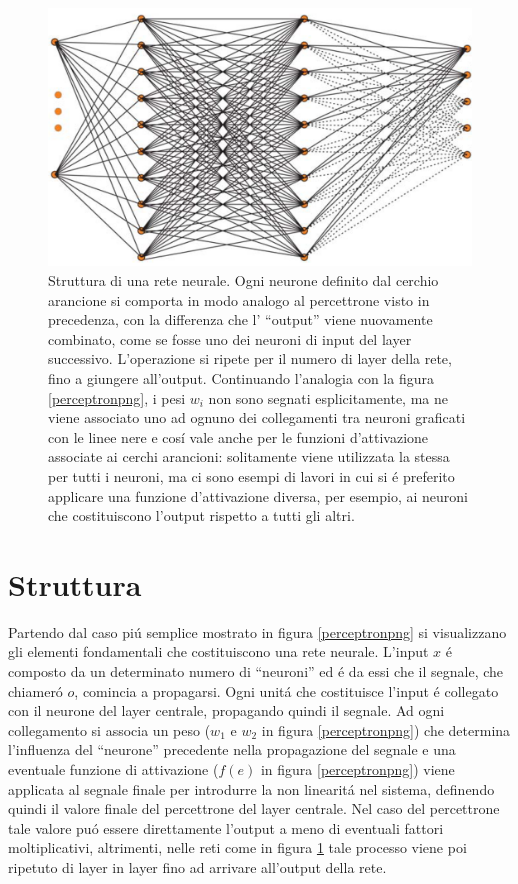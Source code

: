 \documentclass[a4paper,12pt]{report}
\begin{document}
 \begin{figure}[h!]
  \centering
  \includegraphics[scale=0.35]{NeuralNetwork.png}
  \caption{Struttura di una rete neurale. Ogni neurone definito dal cerchio arancione si comporta in modo analogo al percettrone visto in precedenza, con la differenza che l' ``output'' viene nuovamente combinato, come se fosse uno dei neuroni di input del layer successivo. L'operazione si ripete per il numero di layer della rete, fino a giungere all'output. Continuando l'analogia con la figura \ref{perceptronpng}, i pesi $w_i$ non sono segnati esplicitamente, ma ne viene associato uno ad ognuno dei collegamenti tra neuroni graficati con le linee nere e cos\'i vale anche per le funzioni d'attivazione associate ai cerchi arancioni: solitamente viene utilizzata la stessa per tutti i neuroni, ma ci sono esempi di lavori in cui si \'e preferito applicare una funzione d'attivazione diversa, per esempio, ai neuroni che costituiscono l'output rispetto a tutti gli altri.}
  \label{NeuralNetworkpng}
 \end{figure}

 \section{Struttura} 
 Partendo dal caso pi\'u semplice mostrato in figura \ref{perceptronpng} si visualizzano gli elementi fondamentali che costituiscono una rete neurale. 
 L'input $x$ \'e composto da un determinato numero di ``neuroni'' ed \'e da essi che il segnale, che chiamer\'o $o$, comincia a propagarsi. 
 Ogni unit\'a che costituisce l'input \'e collegato con il neurone del layer centrale, propagando quindi il segnale. 
 Ad ogni collegamento si associa un peso ($w_1$ e $w_2$ in figura \ref{perceptronpng}) che determina l'influenza del ``neurone'' precedente nella propagazione del segnale e una eventuale funzione di attivazione ($f(e)$ in figura \ref{perceptronpng}) viene applicata al segnale finale per introdurre la non linearit\'a nel sistema, definendo quindi il valore finale del percettrone del layer centrale. 
 Nel caso del percettrone tale valore pu\'o essere direttamente l'output a meno di eventuali fattori moltiplicativi, altrimenti, nelle reti come in figura \ref{NeuralNetworkpng} tale processo viene poi ripetuto di layer in layer fino ad arrivare all'output della rete.
  
\end{document}
